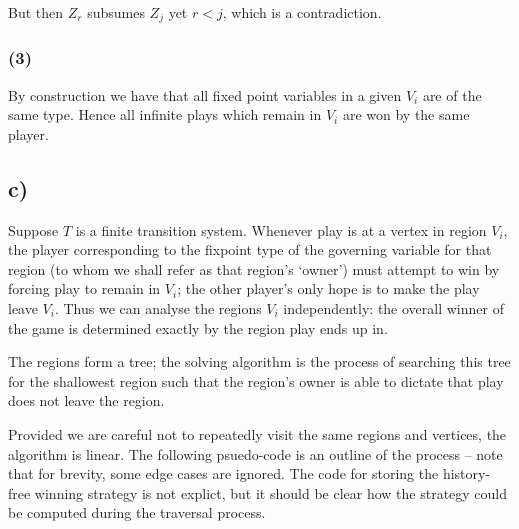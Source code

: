 \documentclass[11pt]{article}
\begin{document}
But then $Z_r$ subsumes $Z_j$ yet $r < j$, which is a contradiction.

\subsubsection*{(3)}

By construction we have that all fixed point variables in a given $V_i$ are of
the same type. Hence all infinite plays which remain in $V_i$ are won by the
same player.

\subsection*{c)}

Suppose $T$ is a finite transition system. Whenever play is at a vertex in
region $V_i$, the player corresponding to the fixpoint type of the governing
variable for that region (to whom we shall refer as that region's `owner') must
attempt to win by forcing play to remain in $V_i$; the other player's only hope
is to make the play leave $V_i$. Thus we can analyse the regions $V_i$
independently: the overall winner of the game is determined exactly by the
region play ends up in.

The regions form a tree; the solving algorithm is the process of searching this
tree for the shallowest region such that the region's owner is able to dictate
that play does not leave the region.

Provided we are careful not to repeatedly visit the same regions and vertices,
the algorithm is linear. The following psuedo-code is an outline of the process
-- note that for brevity, some edge cases are ignored. The code for storing the
history-free winning strategy is not explict, but it should be clear how the
strategy could be computed during the traversal process.
\end{document}
